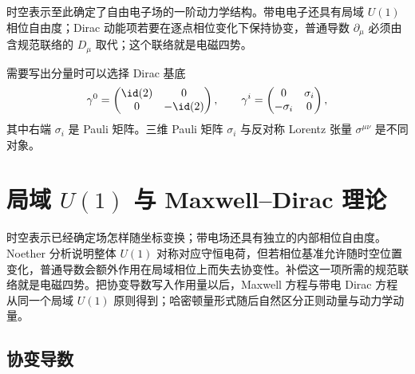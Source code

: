 时空表示至此确定了自由电子场的一阶动力学结构。带电电子还具有局域 $U(1)$ 相位自由度；Dirac 动能项若要在逐点相位变化下保持协变，普通导数 $\partial_\mu$ 必须由含规范联络的 $D_\mu$ 取代；这个联络就是电磁四势。

\begin{note}[一个常用显式表示]
需要写出分量时可以选择 Dirac 基底
\begin{equation*}
 \gamma^0=
 \begin{pmatrix}\id(2)&0\\0&-\id(2)\end{pmatrix},
 \qquad
 \gamma^i=
 \begin{pmatrix}0&\sigma_i\\-\sigma_i&0\end{pmatrix},
\end{equation*}
其中右端 $\sigma_i$ 是 Pauli 矩阵。三维 Pauli 矩阵 $\sigma_i$ 与反对称 Lorentz 张量 $\sigma^{\mu\nu}$ 是不同对象。
\end{note}











\section{局域 $U(1)$ 与 Maxwell--Dirac 理论}

时空表示已经确定场怎样随坐标变换；带电场还具有独立的内部相位自由度。Noether 分析说明整体 $U(1)$ 对称对应守恒电荷，但若相位基准允许随时空位置变化，普通导数会额外作用在局域相位上而失去协变性。补偿这一项所需的规范联络就是电磁四势。把协变导数写入作用量以后，Maxwell 方程与带电 Dirac 方程从同一个局域 $U(1)$ 原则得到；哈密顿量形式随后自然区分正则动量与动力学动量。

\subsection{协变导数}

